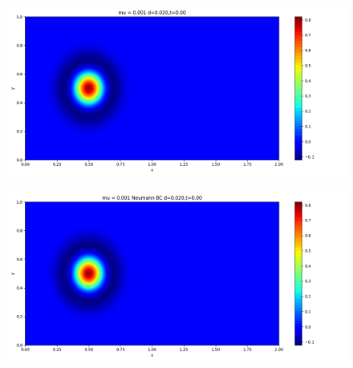 \documentclass[12pt]{article}
\begin{document}
\begin{figure}[H]
    \centering
    \begin{minipage}{\linewidth}
    \centering
    \begin{minipage}{0.5\textwidth}
    \includegraphics[width=\linewidth]{figuresmu/mu3d0.020t0.00.png}
    \label{fig1}
    \end{minipage}\hfill
    \begin{minipage}{0.5\textwidth}
    \includegraphics[width=\linewidth]{figuresmu/mu3Nud0.020t0.00.png}
    \label{fig2}
    \end{minipage}
    \vspace{-1.5em}
    

\end{minipage}
\end{figure}
\end{document}
